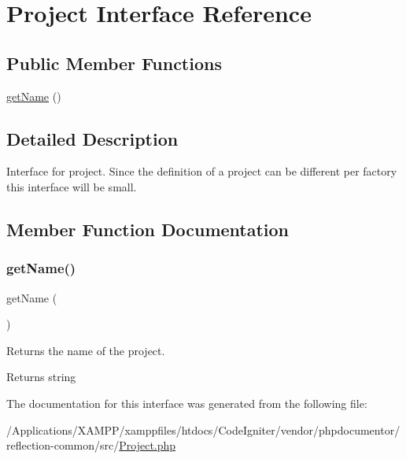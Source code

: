 \hypertarget{interfacephp_documentor_1_1_reflection_1_1_project}{}\section{Project Interface Reference}
\label{interfacephp_documentor_1_1_reflection_1_1_project}
\subsection*{Public Member Functions}
\begin{DoxyCompactItemize}
\item 
\mbox{\hyperlink{interfacephp_documentor_1_1_reflection_1_1_project_a3d0963e68bb313b163a73f2803c64600}{get\+Name}} ()
\end{DoxyCompactItemize}


\subsection{Detailed Description}
Interface for project. Since the definition of a project can be different per factory this interface will be small. 

\subsection{Member Function Documentation}
\mbox{\label{interfacephp_documentor_1_1_reflection_1_1_project_a3d0963e68bb313b163a73f2803c64600}} 
\subsubsection{\texorpdfstring{get\+Name()}{getName()}}
{\footnotesize\ttfamily get\+Name (\begin{DoxyParamCaption}{ }\end{DoxyParamCaption})}

Returns the name of the project.

\begin{DoxyReturn}{Returns}
string 
\end{DoxyReturn}


The documentation for this interface was generated from the following file\+:\begin{DoxyCompactItemize}
\item 
/\+Applications/\+X\+A\+M\+P\+P/xamppfiles/htdocs/\+Code\+Igniter/vendor/phpdocumentor/reflection-\/common/src/\mbox{\hyperlink{phpdocumentor_2reflection-common_2src_2_project_8php}{Project.\+php}}\end{DoxyCompactItemize}
